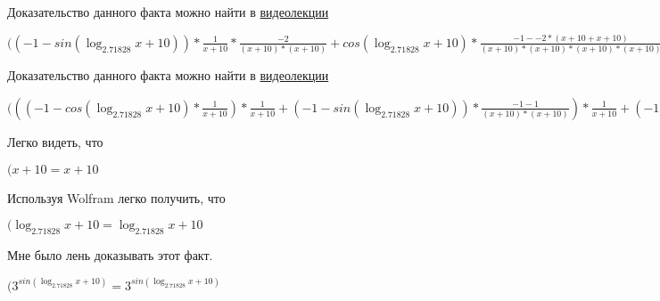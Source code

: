\documentclass[12pt,a4paper,fleqn]{article}
\theoremstyle{definition}
\begin{document}
Доказательство данного факта можно найти в \href{https://www.youtube.com/watch?v=dQw4w9WgXcQ}{видеолекции}

$(( -1  - sin(\log_{ 2.71828 }{ x  +  10 })) * \frac{ 1 }{ x  +  10 }
 * \frac{ -2 }{( x  +  10 ) * ( x  +  10 )}
 + cos(\log_{ 2.71828 }{ x  +  10 }) * \frac{ -1  -  -2  * ( x  +  10  +  x  +  10 )}{( x  +  10 ) * ( x  +  10 ) * ( x  +  10 ) * ( x  +  10 )}
 = ( -1  - sin(\log_{ 2.71828 }{ x  +  10 })) * \frac{ 1 }{ x  +  10 }
 * \frac{ -2 }{( x  +  10 ) * ( x  +  10 )}
 + cos(\log_{ 2.71828 }{ x  +  10 }) * \frac{ -1  -  -2  * ( x  +  10  +  x  +  10 )}{( x  +  10 ) * ( x  +  10 ) * ( x  +  10 ) * ( x  +  10 )}
$

Доказательство данного факта можно найти в \href{https://www.youtube.com/watch?v=dQw4w9WgXcQ}{видеолекции}

$((( -1  - cos(\log_{ 2.71828 }{ x  +  10 }) * \frac{ 1 }{ x  +  10 }
) * \frac{ 1 }{ x  +  10 }
 + ( -1  - sin(\log_{ 2.71828 }{ x  +  10 })) * \frac{ -1  -  1 }{( x  +  10 ) * ( x  +  10 )}
) * \frac{ 1 }{ x  +  10 }
 + ( -1  - sin(\log_{ 2.71828 }{ x  +  10 })) * \frac{ 1 }{ x  +  10 }
 * \frac{ -1  -  1 }{( x  +  10 ) * ( x  +  10 )}
 + ( -1  - sin(\log_{ 2.71828 }{ x  +  10 })) * \frac{ 1 }{ x  +  10 }
 * \frac{ -2 }{( x  +  10 ) * ( x  +  10 )}
 + cos(\log_{ 2.71828 }{ x  +  10 }) * \frac{ -1  -  -2  * ( x  +  10  +  x  +  10 )}{( x  +  10 ) * ( x  +  10 ) * ( x  +  10 ) * ( x  +  10 )}
 = (( -1  - cos(\log_{ 2.71828 }{ x  +  10 }) * \frac{ 1 }{ x  +  10 }
) * \frac{ 1 }{ x  +  10 }
 + ( -1  - sin(\log_{ 2.71828 }{ x  +  10 })) * \frac{ -1  -  1 }{( x  +  10 ) * ( x  +  10 )}
) * \frac{ 1 }{ x  +  10 }
 + ( -1  - sin(\log_{ 2.71828 }{ x  +  10 })) * \frac{ 1 }{ x  +  10 }
 * \frac{ -1  -  1 }{( x  +  10 ) * ( x  +  10 )}
 + ( -1  - sin(\log_{ 2.71828 }{ x  +  10 })) * \frac{ 1 }{ x  +  10 }
 * \frac{ -2 }{( x  +  10 ) * ( x  +  10 )}
 + cos(\log_{ 2.71828 }{ x  +  10 }) * \frac{ -1  -  -2  * ( x  +  10  +  x  +  10 )}{( x  +  10 ) * ( x  +  10 ) * ( x  +  10 ) * ( x  +  10 )}
$

Легко видеть, что

$( x  +  10  =  x  +  10 $

Используя Wolfram легко получить, что

$(\log_{ 2.71828 }{ x  +  10 } = \log_{ 2.71828 }{ x  +  10 }$

Мне было лень доказывать этот факт.

$({ 3 }^{sin(\log_{ 2.71828 }{ x  +  10 })} = { 3 }^{sin(\log_{ 2.71828 }{ x  +  10 })}$
\end{document}
